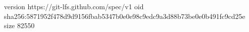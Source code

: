 version https://git-lfs.github.com/spec/v1
oid sha256:5871952f478d9d9156fbab5347b0e0e98c9edc9a3d88b73be0e0b491fc9cd25e
size 82550
